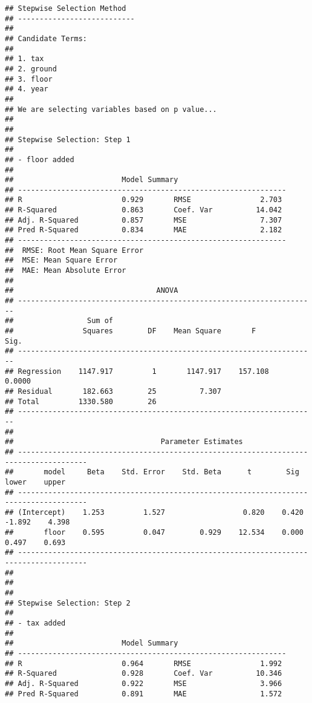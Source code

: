 \documentclass[
]{book}
\begin{document}
\begin{verbatim}
## Stepwise Selection Method   
## ---------------------------
## 
## Candidate Terms: 
## 
## 1. tax 
## 2. ground 
## 3. floor 
## 4. year 
## 
## We are selecting variables based on p value...
## 
## 
## Stepwise Selection: Step 1 
## 
## - floor added 
## 
##                         Model Summary                          
## --------------------------------------------------------------
## R                       0.929       RMSE                2.703 
## R-Squared               0.863       Coef. Var          14.042 
## Adj. R-Squared          0.857       MSE                 7.307 
## Pred R-Squared          0.834       MAE                 2.182 
## --------------------------------------------------------------
##  RMSE: Root Mean Square Error 
##  MSE: Mean Square Error 
##  MAE: Mean Absolute Error 
## 
##                                 ANOVA                                 
## ---------------------------------------------------------------------
##                 Sum of                                               
##                Squares        DF    Mean Square       F         Sig. 
## ---------------------------------------------------------------------
## Regression    1147.917         1       1147.917    157.108    0.0000 
## Residual       182.663        25          7.307                      
## Total         1330.580        26                                     
## ---------------------------------------------------------------------
## 
##                                  Parameter Estimates                                   
## --------------------------------------------------------------------------------------
##       model     Beta    Std. Error    Std. Beta      t        Sig      lower    upper 
## --------------------------------------------------------------------------------------
## (Intercept)    1.253         1.527                  0.820    0.420    -1.892    4.398 
##       floor    0.595         0.047        0.929    12.534    0.000     0.497    0.693 
## --------------------------------------------------------------------------------------
## 
## 
## 
## Stepwise Selection: Step 2 
## 
## - tax added 
## 
##                         Model Summary                          
## --------------------------------------------------------------
## R                       0.964       RMSE                1.992 
## R-Squared               0.928       Coef. Var          10.346 
## Adj. R-Squared          0.922       MSE                 3.966 
## Pred R-Squared          0.891       MAE                 1.572 

\end{verbatim}
\end{document}

